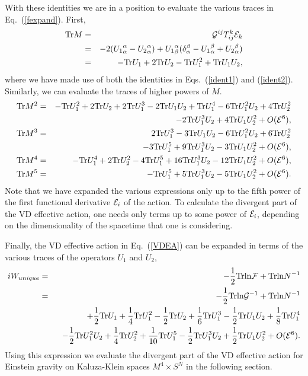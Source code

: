 \documentclass[a4paper,aps,preprint,groupedaddress,showpacs]{revtex4}
\begin{document}
With these identities we are in a position to evaluate the various
traces in Eq.~(\ref{fexpand}). First,
\begin{eqnarray}
{\rm Tr}M
&=&{\cal G}^{ij}T^{k}_{ij}{\cal E}_{k} 
\nonumber\\
&=&-2({U_{1}}^{\alpha}_{\alpha}-{U_{2}}^{\alpha}_{\alpha})+
{U_{1}}^{\alpha}_{\beta}(\delta^{\beta}_{\alpha}-
{U_{1}}^{\beta}_{\alpha}+{U_{2}}^{\beta}_{\alpha})
\nonumber\\
&=&-{\rm Tr}U_{1}+2{\rm Tr}U_{2}-{\rm Tr}U^{2}_{1}+
{\rm Tr}U_{1}U_{2},
\end{eqnarray}
where we have made use of both the identities in 
Eqs.~(\ref{ident1}) and (\ref{ident2}).
Similarly, we can evaluate the traces of higher powers of $M$.
\begin{eqnarray}
{\rm Tr}M^{2}
&=&-{\rm Tr}U^{2}_{1}+2{\rm Tr}U_{2}+2{\rm Tr}U^{3}_{1}-
2{\rm Tr}U_{1}U_{2}+{\rm Tr}U^{4}_{1}-6{\rm Tr}U^{2}_{1}U_{2}+
4{\rm Tr}U^{2}_{2}
\nonumber\\
&&\ \ -2{\rm Tr}U^{3}_{1}U_{2}+
4{\rm Tr}U_{1}U^{2}_{2}+O({\cal E}^{6}),
\\
{\rm Tr}M^{3}
&=&2{\rm Tr}U^{3}_{1}-3{\rm Tr}U_{1}U_{2}-6{\rm Tr}U^{2}_{1}U_{2}+
6{\rm Tr}U^{2}_{2}
\nonumber\\
&&\ \ -3{\rm Tr}U^{5}_{1}+9{\rm Tr}U^{3}_{1}U_{2}-
3{\rm Tr}U_{1}U^{2}_{2}+O({\cal E}^{6}),
\\
{\rm Tr}M^{4}
&=&-{\rm Tr}U^{4}_{1}+2{\rm Tr}U^{2}_{2}-4{\rm Tr}U^{5}_{1}+
16{\rm Tr}U^{3}_{1}U_{2}-12{\rm Tr}U_{1}U^{2}_{2}+
O({\cal E}^{6}),
\\
{\rm Tr}M^{5}
&=&-{\rm Tr}U^{5}_{1}+5{\rm Tr}U^{3}_{1}U_{2}-
5{\rm Tr}U_{1}U^{2}_{2}+O({\cal E}^{6}).
\end{eqnarray}
Note that we have expanded the various expressions only up to the
fifth power of the first functional derivative ${\cal E}_{i}$ of 
the action. To calculate the divergent part of the VD effective
action, one needs only terms up to some power of ${\cal E}_{i}$,
depending on the dimensionality of the spacetime that one is 
considering.

Finally, the VD effective action in Eq.~(\ref{VDEA})
can be expanded in terms of the 
various traces of the operators $U_{1}$ and $U_{2}$,
\begin{eqnarray}
iW_{unique}&=&-\frac{1}{2}{\rm Trln}{\cal F}+{\rm Trln}N^{-1}
\nonumber\\
&=&-\frac{1}{2}{\rm Trln}{\cal G}^{-1}+{\rm Trln}N^{-1}
\nonumber\\
&&\ \ +\frac{1}{2}{\rm Tr}U_{1}+\frac{1}{4}{\rm Tr}U^{2}_{1}-
\frac{1}{2}{\rm Tr}U_{2}+\frac{1}{6}{\rm Tr}U^{3}_{1}-
\frac{1}{2}{\rm Tr}U_{1}U_{2}+\frac{1}{8}{\rm Tr}U^{4}_{1}
\nonumber\\
&&\ \ -\frac{1}{2}{\rm Tr}U^{2}_{1}U_{2}+
\frac{1}{4}{\rm Tr}U^{2}_{2}+
\frac{1}{10}{\rm Tr}U^{5}_{1}-
\frac{1}{2}{\rm Tr}U^{3}_{1}U_{2}+
\frac{1}{2}{\rm Tr}U_{1}U^{2}_{2}+O({\cal E}^{6}).
\end{eqnarray}
Using this expression 
we evaluate the divergent part
of the VD effective action for Einstein
gravity on Kaluza-Klein spaces $M^{4}\times S^{N}$ 
in the following section.
\end{document}
